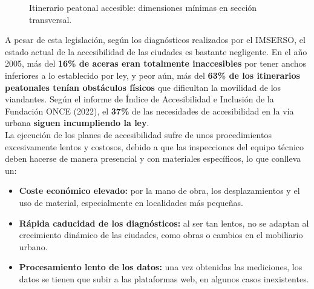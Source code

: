 \begin{figure}[htbp]
  \caption{Itinerario peatonal accesible: dimensiones mínimas en sección transversal.}
  \label{fig:ipa-seccion}
\end{figure}


A pesar de esta legislación, según los diagnósticos realizados por el IMSERSO, el estado actual de la accesibilidad de las ciudades es bastante negligente. En el año 2005, más del \textbf{16\% de aceras eran totalmente inaccesibles} por tener anchos inferiores a lo establecido por ley, y peor aún, más del \textbf{63\% de los itinerarios peatonales tenían obstáculos físicos} que dificultan la movilidad de los viandantes. Según el informe de Índice de Accesibilidad e Inclusión de la Fundación ONCE (2022), el \textbf{37\%} de las necesidades de accesibilidad en la vía urbana \textbf{siguen incumpliendo la ley}.
\\

La ejecución de los planes de accesibilidad sufre de unos procedimientos excesivamente lentos y costosos, debido a que las inspecciones del equipo técnico deben hacerse de manera presencial y con materiales específicos, lo que conlleva un:
\begin{itemize}
    \item \textbf{Coste económico elevado:} por la mano de obra, los desplazamientos y el uso de material, especialmente en localidades más pequeñas.
    \item \textbf{Rápida caducidad de los diagnósticos:} al ser tan lentos, no se adaptan al crecimiento dinámico de las ciudades, como obras o cambios en el mobiliario urbano.
    \item \textbf{Procesamiento lento de los datos:} una vez obtenidas las mediciones, los datos se tienen que subir a las plataformas web, en algunos casos inexistentes.
\end{itemize}

